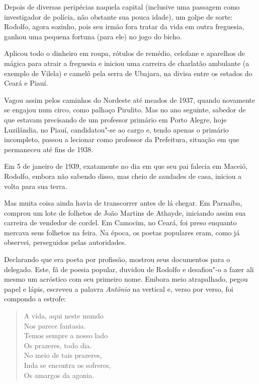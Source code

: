  Depois de diversas peripécias naquela capital (inclusive uma passagem
como investigador de polícia, não obstante sua pouca idade), um golpe
de sorte: Rodolfo, agora sozinho, pois seu irmão fora tratar da vida em
outra freguesia, ganhou uma pequena fortuna (para ele) no jogo do
bicho. 

 Aplicou todo o dinheiro em roupa, rótulos de remédio, celofane e
aparelhos de mágica para atrair a freguesia e iniciou uma carreira de
charlatão ambulante (a exemplo de Vilela) e camelô pela serra de
Ubajara, na divisa entre os estados do Ceará e Piauí. 

 Vagou assim pelos caminhos do Nordeste até meados de 1937, quando
novamente se engajou num circo, como palhaço Pirulito. Mas no ano
seguinte, sabedor de que estavam precisando de um professor primário em
Porto Alegre, hoje Luzilândia, no Piauí, candidatou"-se ao cargo e,
tendo apenas o primário incompleto, passou a lecionar como professor da
Prefeitura, situação em que permaneceu até fins de 1938. 

 Em 5 de janeiro de 1939, exatamente no dia em que seu pai falecia em
Maceió, Rodolfo, embora não sabendo disso, mas cheio de saudades de
casa, iniciou a volta para sua terra. 

 Mas muita coisa ainda havia de transcorrer antes de lá chegar. Em
Parnaíba, comprou um lote de folhetos de João Martins de Athayde,
iniciando assim sua carreira de vendedor de cordel. Em Camocim, no
Ceará, foi preso enquanto mercava seus folhetos na feira. Na época, os
poetas populares eram, como já observei, perseguidos pelas autoridades.


 Declarando que era poeta por profissão, mostrou seus documentos para o
delegado. Este, fã de poesia popular, duvidou de Rodolfo e desafiou"-o
a fazer ali mesmo um acróstico com seu primeiro nome. Embora meio
atrapalhado, pegou papel e lápis, escreveu a palavra \textit{Antônio}
na vertical e, verso por verso, foi compondo a estrofe: 

\begin{verse}
A vida, aqui neste mundo \\
Nos parece fantasia. \\
Temos sempre a nosso lado \\
Os prazeres, todo dia. \\
No meio de tais prazeres, \\
Inda se encontra os sofreres, \\
Os amargos da agonia. 
\end{verse}

